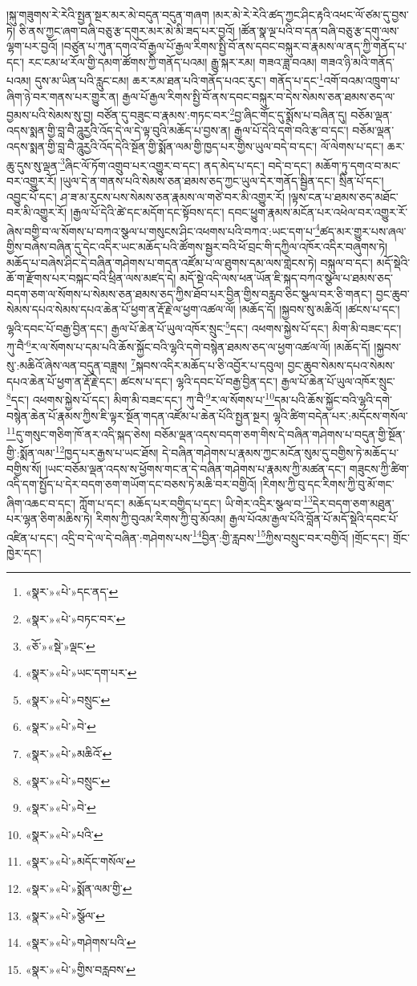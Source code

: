 །སྐུ་གཟུགས་རེ་རེའི་སྤྱན་སྔར་མར་མེ་བདུན་བདུན་གཞག །མར་མེ་རེ་རེའི་ཚད་ཀྱང་ཤིང་རྟའི་འཕང་ལོ་ཙམ་དུ་བྱས་ཏེ། ཅི་ནས་ཀྱང་ཞག་བཞི་བཅུ་རྩ་དགུར་མར་མེ་མི་ཟད་པར་བྱའོ། །ཚོན་སྣ་ལྔ་པའི་བ་དན་བཞི་བཅུ་རྩ་དགུ་ལས་ལྷག་པར་བྱའོ། །བཙུན་པ་ཀུན་དགའ་བོ་རྒྱལ་པོ་རྒྱལ་རིགས་སྤྱི་བོ་ནས་དབང་བསྐུར་བ་རྣམས་ལ་ནད་ཀྱི་གནོད་པ་དང་། རང་ངམ་ཕ་རོལ་གྱི་དམག་ཚོགས་ཀྱི་གནོད་པའམ། རྒྱུ་སྐར་རམ། གཟའ་ཟླ་བའམ། གཟའ་ཉི་མའི་གནོད་པའམ། དུས་མ་ཡིན་པའི་རླུང་ངམ། ཆར་རམ་ཐན་པའི་གནོད་པའང་རུང་། གནོད་པ་དང་\footnote{«སྣར་»«པེ་»དང་ནད་}འགོ་བའམ་འཁྲུག་པ་ཞིག་ཉེ་བར་གནས་པར་གྱུར་ན། རྒྱལ་པོ་རྒྱལ་རིགས་སྤྱི་བོ་ནས་དབང་བསྐུར་བ་དེས་སེམས་ཅན་ཐམས་ཅད་ལ་བྱམས་པའི་སེམས་སུ་བྱ། བཙོན་དུ་བཟུང་བ་རྣམས་:གཏང་བར་\footnote{«སྣར་»«པེ་»བཏང་བར་}བྱ་ཞིང་གོང་དུ་སྨོས་པ་བཞིན་དུ། བཅོམ་ལྡན་འདས་སྨན་གྱི་བླ་བཻ་ཌཱུརྱའི་འོད་དེ་ལ་དེ་ལྟ་བུའི་མཆོད་པ་བྱས་ན། རྒྱལ་པོ་དེའི་དགེ་བའི་རྩ་བ་དང་། བཅོམ་ལྡན་འདས་སྨན་གྱི་བླ་བཻ་ཌཱུརྱའི་འོད་དེའི་སྔོན་གྱི་སྨོན་ལམ་གྱི་ཁྱད་པར་གྱིས་ཡུལ་བདེ་བ་དང་། ལོ་ལེགས་པ་དང་། ཆར་ཆུ་དུས་སུ་ལྡན་\footnote{«ཅོ་»«སྡེ་»ལྡང་}ཞིང་ལོ་ཏོག་འགྲུབ་པར་འགྱུར་བ་དང་། ནད་མེད་པ་དང་། བདེ་བ་དང་། མཆོག་ཏུ་དགའ་བ་མང་བར་འགྱུར་རོ། །ཡུལ་དེ་ན་གནས་པའི་སེམས་ཅན་ཐམས་ཅད་ཀྱང་ཡུལ་དེར་གནོད་སྦྱིན་དང་། སྲིན་པོ་དང་། འབྱུང་པོ་དང་། ཤ་ཟ་མ་རུངས་པས་སེམས་ཅན་རྣམས་ལ་གཙེ་བར་མི་འགྱུར་རོ། །ལྟས་ངན་པ་ཐམས་ཅད་མཐོང་བར་མི་འགྱུར་རོ། །རྒྱལ་པོ་དེའི་ཚེ་དང་མདོག་དང་སྟོབས་དང་། དབང་ཕྱུག་རྣམས་མངོན་པར་འཕེལ་བར་འགྱུར་རོ་ཞེས་བགྱི་བ་ལ་སོགས་པ་བཀའ་སྩལ་པ་གསུངས་ཤིང་འཕགས་པའི་བཀའ་:ཡང་དག་པ་\footnote{«སྣར་»«པེ་»ཡང་དག་པར་}ཚད་མར་གྱུར་པས་ཞལ་གྱིས་བཞེས་བཞིན་དུ་དེང་འདིར་ཡང་མཆོད་པའི་ཚོགས་སྦྱར་བའི་ཕོ་བྲང་གི་དཀྱིལ་འཁོར་འདིར་བཞུགས་ཏེ། མཆོད་པ་བཞེས་ཤིང་དེ་བཞིན་གཤེགས་པ་གདན་འཛོམ་པ་ལ་ཐུགས་དམ་ལས་གླེངས་ཏེ། བསྐུལ་བ་དང་། མདོ་སྡེའི་ཆོ་ག་རྫོགས་པར་བསྐང་བའི་ཕྲིན་ལས་མཛད་དེ། མདོ་སྡེ་འདི་ལས་ཕན་ཡོན་ཇི་སྐད་བཀའ་སྩལ་པ་ཐམས་ཅད་བདག་ཅག་ལ་སོགས་པ་སེམས་ཅན་ཐམས་ཅད་ཀྱིས་ཐོབ་པར་བྱིན་གྱིས་བརླབ་ཅིང་སྩལ་བར་ཅི་གནང་། བྱང་ཆུབ་སེམས་དཔའ་སེམས་དཔའ་ཆེན་པོ་ཕྱག་ན་རྡོ་རྗེ་ལ་ཕྱག་འཚལ་ལོ། །མཆོད་དོ། །སྐྱབས་སུ་མཆིའོ། །ཚངས་པ་དང་། ལྷའི་དབང་པོ་བརྒྱ་བྱིན་དང་། རྒྱལ་པོ་ཆེན་པོ་ཡུལ་འཁོར་སྲུང་\footnote{«སྣར་»«པེ་»བསྲུང་}དང་། འཕགས་སྐྱེས་པོ་དང་། མིག་མི་བཟང་དང་། ཀུ་བཻ་\footnote{«སྣར་»«པེ་»བེ་}ར་ལ་སོགས་པ་དམ་པའི་ཆོས་སྐྱོང་བའི་ལྷའི་དགེ་བསྙེན་ཐམས་ཅད་ལ་ཕྱག་འཚལ་ལོ། །མཆོད་དོ། །སྐྱབས་སུ་:མཆིའོ་ཞེས་ལན་བདུན་བཟླས། \footnote{«སྣར་»«པེ་»མཆིའོ་}སྐབས་འདིར་མཆོད་པ་ཅི་འབྱོར་པ་དབུལ། བྱང་ཆུབ་སེམས་དཔའ་སེམས་དཔའ་ཆེན་པོ་ཕྱག་ན་རྡོ་རྗེ་དང་། ཚངས་པ་དང་། ལྷའི་དབང་པོ་བརྒྱ་བྱིན་དང་། རྒྱལ་པོ་ཆེན་པོ་ཡུལ་འཁོར་སྲུང་\footnote{«སྣར་»«པེ་»བསྲུང་}དང་། འཕགས་སྐྱེས་པོ་དང་། མིག་མི་བཟང་དང་། ཀུ་བཻ་\footnote{«སྣར་»«པེ་»བེ་}ར་ལ་སོགས་པ་\footnote{«སྣར་»«པེ་»པའི་}དམ་པའི་ཆོས་སྐྱོང་བའི་ལྷའི་དགེ་བསྙེན་ཆེན་པོ་རྣམས་ཀྱིས་ཇི་ལྟར་སྔོན་གདན་འཛོམ་པ་ཆེན་པོའི་སྤྱན་སྔར། ལྷའི་ཚིག་བདེན་པར་:མདོངས་གསོལ་\footnote{«སྣར་»«པེ་»མདོང་གསོལ་}དུ་གསུང་གཅིག་ཁོ་ནར་འདི་སྐད་ཅེས། བཅོམ་ལྡན་འདས་བདག་ཅག་གིས་དེ་བཞིན་གཤེགས་པ་བདུན་གྱི་སྔོན་གྱི་:སྨོན་ལམ་\footnote{«སྣར་»«པེ་»སྨོན་ལམ་གྱི་}ཁྱད་པར་རྒྱས་པ་ཡང་ཐོས། དེ་བཞིན་གཤེགས་པ་རྣམས་ཀྱང་མངོན་སུམ་དུ་བགྱིས་ཏེ་མཆོད་པ་བགྱིས་སོ། །ཡང་བཅོམ་ལྡན་འདས་ས་ཕྱོགས་གང་ན་དེ་བཞིན་གཤེགས་པ་རྣམས་ཀྱི་མཚན་དང་། གཟུངས་ཀྱི་ཚིག་འདི་དག་སྤྱོད་པ་དེར་བདག་ཅག་གཡོག་དང་བཅས་ཏེ་མཆི་བར་བགྱིའོ། །རིགས་ཀྱི་བུ་དང་རིགས་ཀྱི་བུ་མོ་གང་ཞིག་འཆང་བ་དང་། ཀློག་པ་དང་། མཆོད་པར་བགྱིད་པ་དང་། ཡི་གེར་འདྲིར་སྩལ་བ་\footnote{«སྣར་»«པེ་»སྩོལ་}དེར་བདག་ཅག་མཐུན་པར་ལྷན་ཅིག་མཆིས་ཏེ། རིགས་ཀྱི་བུའམ་རིགས་ཀྱི་བུ་མོའམ། རྒྱལ་པོའམ་རྒྱལ་པོའི་བློན་པོ་མདོ་སྡེའི་དབང་པོ་འཛིན་པ་དང་། འདྲི་བ་དེ་ལ་དེ་བཞིན་:གཤེགས་པས་\footnote{«སྣར་»«པེ་»གཤེགས་པའི་}བྱིན་:གྱི་རླབས་\footnote{«སྣར་»«པེ་»གྱིས་བརླབས་}ཀྱིས་བསྲུང་བར་བགྱིའོ། །གྲོང་དང་། གྲོང་ཁྱེར་དང་། 